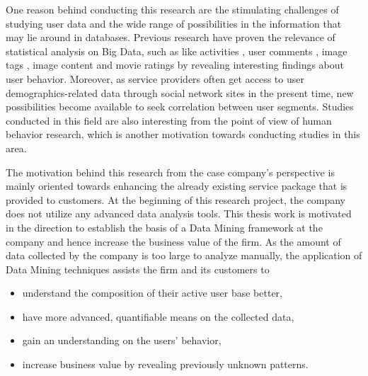     One reason behind conducting this research are the stimulating challenges of studying user data and the wide range of possibilities in the information that may lie around in databases. Previous research have proven the relevance of statistical analysis on Big Data, such as like activities \cite{jang2015noreciprocity, jang2016teensengagemorewithfewerphotos, ottoni2013ladies, guy2016whatsyourorganizationlike, jang2015no, youyou2015computer}, user comments \cite{jang2016teensengagemorewithfewerphotos}, image tags \cite{jang2016teensengagemorewithfewerphotos}, image content \cite{hu2014we, bakhshi2014faces} and movie ratings \cite{saraee2004data, kabinsingha2012movie} by revealing interesting findings about user behavior. Moreover, as service providers often get access to user demographics-related data through social network sites in the present time, new possibilities become available to seek correlation between user segments. Studies conducted in this field are also interesting from the point of view of human behavior research, which is another motivation towards conducting studies in this area. 

    The motivation behind this research from the case company's perspective is mainly oriented towards enhancing the already existing service package that is provided to customers. At the beginning of this research project, the company does not utilize any advanced data analysis tools. This thesis work is motivated in the direction to establish the basis of a Data Mining framework at the company and hence increase the business value of the firm. As the amount of data collected by the company is too large to analyze manually, the application of Data Mining techniques assists the firm and its customers to 

    \begin{itemize}
        \item understand the composition of their active user base better,
        \item have more advanced, quantifiable means on the collected data,
        \item gain an understanding on the users' behavior, 
        \item increase business value by revealing previously unknown patterns.
    \end{itemize} 

\pagebreak

